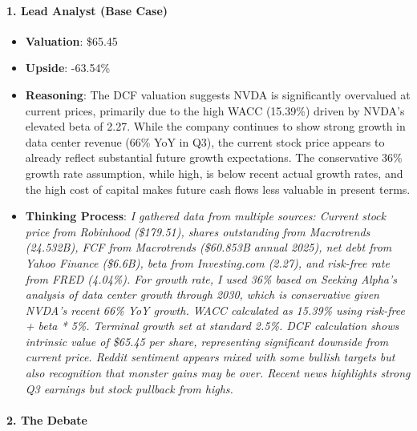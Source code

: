 \documentclass{article}
\begin{document}
\paragraph{1. Lead Analyst (Base Case)}
\begin{itemize}
    \item \textbf{Valuation}: \$65.45
    \item \textbf{Upside}: -63.54\%
    \item \textbf{Reasoning}: The DCF valuation suggests NVDA is significantly overvalued at current prices, primarily due to the high WACC (15.39\%) driven by NVDA's elevated beta of 2.27. While the company continues to show strong growth in data center revenue (66\% YoY in Q3), the current stock price appears to already reflect substantial future growth expectations. The conservative 36\% growth rate assumption, while high, is below recent actual growth rates, and the high cost of capital makes future cash flows less valuable in present terms.
    \item \textbf{Thinking Process}: \textit{I gathered data from multiple sources: Current stock price from Robinhood (\$179.51), shares outstanding from Macrotrends (24.532B), FCF from Macrotrends (\$60.853B annual 2025), net debt from Yahoo Finance (\$6.6B), beta from Investing.com (2.27), and risk-free rate from FRED (4.04\%). For growth rate, I used 36\% based on Seeking Alpha's analysis of data center growth through 2030, which is conservative given NVDA's recent 66\% YoY growth. WACC calculated as 15.39\% using risk-free + beta * 5\%. Terminal growth set at standard 2.5\%. DCF calculation shows intrinsic value of \$65.45 per share, representing significant downside from current price. Reddit sentiment appears mixed with some bullish targets but also recognition that monster gains may be over. Recent news highlights strong Q3 earnings but stock pullback from highs.}
\end{itemize}

\paragraph{2. The Debate}
\end{document}
